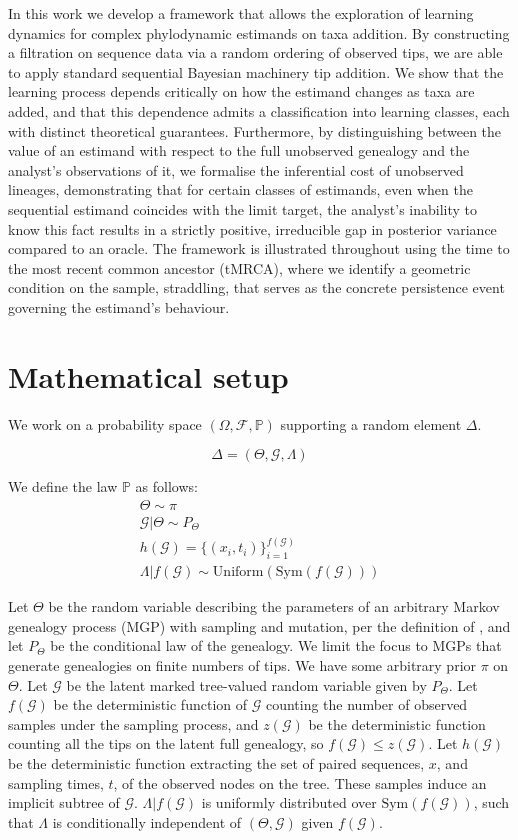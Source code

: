 \documentclass{article}
\begin{document}
In this work we develop a framework that allows the exploration of learning dynamics for complex phylodynamic estimands on taxa addition. By constructing a filtration on sequence data via a random ordering of observed tips, we are able to apply standard sequential Bayesian machinery tip addition. We show that the learning process depends critically on how the estimand changes as taxa are added, and that this dependence admits a classification into learning classes, each with distinct theoretical guarantees. Furthermore, by distinguishing between the value of an estimand with respect to the full unobserved genealogy and the analyst's observations of it, we formalise the inferential cost of unobserved lineages, demonstrating that for certain classes of estimands, even when the sequential estimand coincides with the limit target, the analyst's inability to know this fact results in a strictly positive, irreducible gap in posterior variance compared to an oracle. The framework is illustrated throughout using the time to the most recent common ancestor (tMRCA), where we identify a geometric condition on the sample, straddling, that serves as the concrete persistence event governing the estimand's behaviour.

\section{Mathematical setup}
We work on a probability space $(\Omega,\mathcal{F},\mathbb{P})$ supporting a random element $\Delta$.

\[\Delta = (\Theta,\mathcal{G},\Lambda)\]

We define the law $\mathbb{P}$ as follows:
\begin{gather*}
    \Theta \sim \pi\\
    \mathcal{G}|\Theta \sim P_\Theta\\
    h(\mathcal{G}) = \{(x_i,t_i)\}_{i=1}^{f(\mathcal{G})}\\
    \Lambda|f(\mathcal{G}) \sim \mathrm{Uniform}(\mathrm{Sym}(f(\mathcal{G})))
\end{gather*}

Let $\Theta$ be the random variable describing the parameters of an arbitrary Markov genealogy process (MGP) with sampling and mutation, per the definition of \citet{king2025genealogy}, and let $P_\Theta$ be the conditional law of the genealogy. We limit the focus to MGPs that generate genealogies on finite numbers of tips. We have some arbitrary prior $\pi$ on $\Theta$. Let $\mathcal{G}$ be the latent marked tree-valued random variable given by $P_\Theta$. Let $f(\mathcal{G})$ be the deterministic function of $\mathcal{G}$ counting the number of observed samples under the sampling process, and $z(\mathcal{G})$ be the deterministic function counting all the tips on the latent full genealogy, so $f(\mathcal{G})\leq z(\mathcal{G})$. Let $h(\mathcal{G})$ be the deterministic function extracting the set of paired sequences, $x$, and sampling times, $t$, of the observed nodes on the tree. These samples induce an implicit subtree of $\mathcal{G}$. $\Lambda|f(\mathcal{G})$ is uniformly distributed over $\mathrm{Sym}(f(\mathcal{G}))$, such that $\Lambda$ is conditionally independent of $(\Theta,\mathcal{G})$ given $f(\mathcal{G})$.
\end{document}
